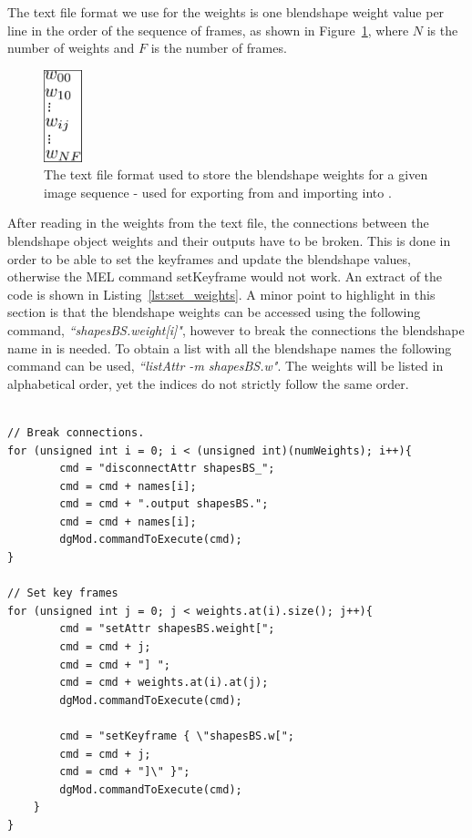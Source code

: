 The text file format we use for the weights is one blendshape weight value per line in the order of the sequence of frames, as shown in Figure~\ref{fig:file_format}, where $N$ is the number of weights and $F$ is the number of frames.

\begin{figure}[htbp!]
\centering
\includegraphics[width=0.1\textwidth]{img/file_format}
	\caption{The text file format used to store the blendshape weights for a given image sequence - used for exporting from \Matlab and importing into \Maya.}
	\label{fig:file_format}
\end{figure}

After reading in the weights from the text file, the connections between the blendshape object weights and their outputs have to be broken. This is done in order to be able to set the keyframes and update the blendshape values, otherwise the MEL command setKeyframe would not work. An extract of the code is shown in Listing~\ref{lst:set_weights}.
A minor point to highlight in this section is that the blendshape weights can be accessed using the following command, \textit{``shapesBS.weight[i]"}, however to break the connections the blendshape name in \Maya is needed.
To obtain a list with all the blendshape names the following command can be used, \textit{``listAttr -m shapesBS.w"}.
The weights will be listed in alphabetical order, yet the indices do not strictly follow the same order. 

\begin{lstlisting}[caption = Breaking the weights connections and setting keyframes., label = lst:set_weights, frame=single]

// Break connections.
for (unsigned int i = 0; i < (unsigned int)(numWeights); i++){
		cmd = "disconnectAttr shapesBS_";
		cmd = cmd + names[i];
		cmd = cmd + ".output shapesBS.";
		cmd = cmd + names[i];
		dgMod.commandToExecute(cmd);
}

// Set key frames
for (unsigned int j = 0; j < weights.at(i).size(); j++){
		cmd = "setAttr shapesBS.weight[";
		cmd = cmd + j;
		cmd = cmd + "] ";
		cmd = cmd + weights.at(i).at(j);
		dgMod.commandToExecute(cmd);
		
		cmd = "setKeyframe { \"shapesBS.w[";
		cmd = cmd + j;
		cmd = cmd + "]\" }";
		dgMod.commandToExecute(cmd);
	}
}
\end{lstlisting}

